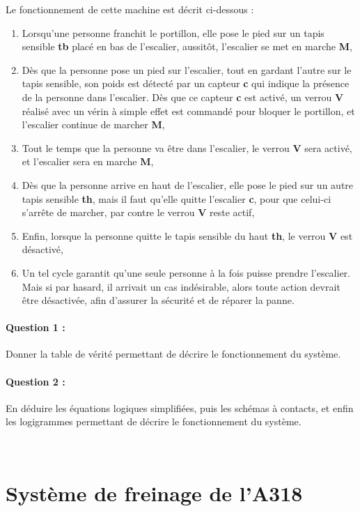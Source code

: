 Le fonctionnement de cette machine est décrit ci-dessous :
\begin{enumerate}
 \item Lorsqu'une personne franchit le portillon, elle pose le pied sur un tapis sensible \textbf{tb} placé en bas de l'escalier, aussitôt, l'escalier se met en marche \textbf{M},
 \item Dès que la personne pose un pied sur l'escalier, tout en gardant l'autre sur le tapis sensible, son poids est détecté par un capteur \textbf{c} qui indique la présence de la personne dans l'escalier. Dès que ce capteur \textbf{c} est activé, un verrou \textbf{V} réalisé avec un vérin à simple effet est commandé pour bloquer le portillon, et l'escalier continue de marcher \textbf{M},
 \item Tout le temps que la personne va être dans l'escalier, le verrou \textbf{V} sera activé, et l'escalier sera en marche \textbf{M},
 \item Dès que la personne arrive en haut de l'escalier, elle pose le pied sur un autre tapis sensible \textbf{th}, mais il faut qu'elle quitte l'escalier \textbf{c}, pour que celui-ci s'arrête de marcher, par contre le verrou \textbf{V} reste actif,
 \item Enfin, lorsque la personne quitte le tapis sensible du haut \textbf{th}, le verrou \textbf{V} est désactivé,
 \item Un tel cycle garantit qu'une seule personne à la fois puisse prendre l'escalier. Mais si par hasard, il arrivait un cas indésirable, alors toute action devrait être désactivée, afin d'assurer la sécurité et de réparer la panne.
\end{enumerate}

\paragraph{Question 1 :} Donner la table de vérité permettant de décrire le fonctionnement du système.

\paragraph{Question 2 :} En déduire les équations logiques simplifiées, puis les schémas à contacts, et enfin les  logigrammes permettant de décrire le fonctionnement du système.

\newpage

~\

\newpage

\section{Système de freinage de l'A318}


